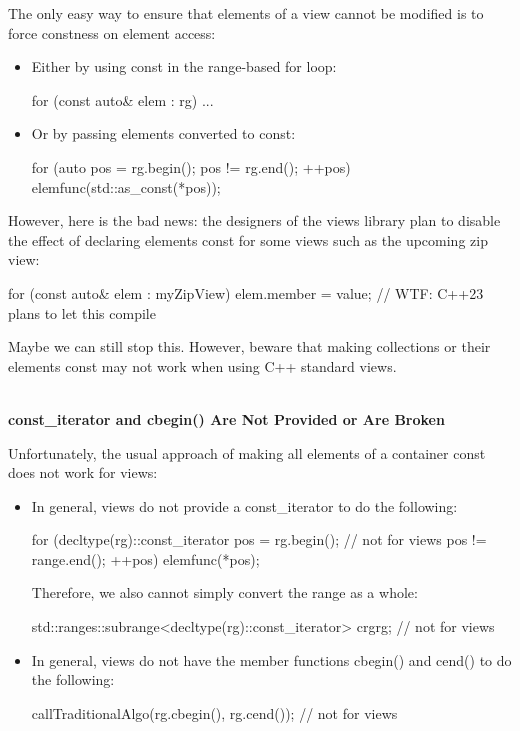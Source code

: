 The only easy way to ensure that elements of a view cannot be modified is to force constness on element access:

\begin{itemize}
\item
Either by using const in the range-based for loop:

\begin{cpp}
for (const auto& elem : rg) {
	...
}
\end{cpp}

\item
Or by passing elements converted to const:

\begin{cpp}
for (auto pos = rg.begin(); pos != rg.end(); ++pos) {
	elemfunc(std::as_const(*pos));
}
\end{cpp}
\end{itemize}

However, here is the bad news: the designers of the views library plan to disable the effect of declaring elements const for some views such as the upcoming zip view:

\begin{cpp}
for (const auto& elem : myZipView) {
	elem.member = value; // WTF: C++23 plans to let this compile
}
\end{cpp}

Maybe we can still stop this. However, beware that making collections or their elements const may not work when using C++ standard views.

\noindent
\hspace*{\fill} \\ %
\textbf{const\_iterator and cbegin() Are Not Provided or Are Broken}

Unfortunately, the usual approach of making all elements of a container const does not work for views:

\begin{itemize}
\item
In general, views do not provide a const\_iterator to do the following:

\begin{cpp}
for (decltype(rg)::const_iterator pos = rg.begin(); // not for views
pos != range.end();
++pos) {
	elemfunc(*pos);
}
\end{cpp}

Therefore, we also cannot simply convert the range as a whole:

\begin{cpp}
std::ranges::subrange<decltype(rg)::const_iterator> crg{rg}; // not for views
\end{cpp}

\item
In general, views do not have the member functions cbegin() and cend() to do the following:

\begin{cpp}
callTraditionalAlgo(rg.cbegin(), rg.cend()); // not for views
\end{cpp}
\end{itemize}

